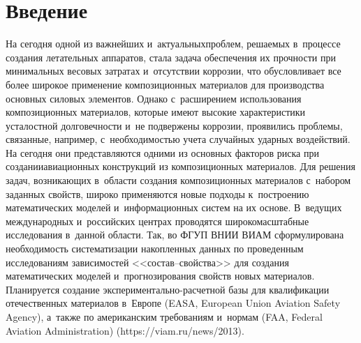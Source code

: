 
  
\vspace*{-4pt}



\thispagestyle{headings}

\begin{multicols}{2}

\label{st\stat}
      
\section{Введение}

     На сегодня одной из важнейших и~актуальных\linebreak проблем, решаемых 
в~процессе создания летательных аппаратов, стала задача обеспечения их 
прочности при минимальных весовых затратах и~отсутствии коррозии, что 
обусловливает все более \mbox{широкое} применение композиционных материалов для 
производства основных силовых элементов. Однако с~расширением 
использования композиционных материалов, которые имеют высокие 
характеристики усталостной долговечности и~не подвержены коррозии, 
проявились проб\-ле\-мы, связанные, например, с~необходимостью учета случайных 
ударных воздействий. На сегодня они пред\-став\-ля\-ют\-ся одними из основных 
факторов риска при создании\linebreak авиационных конструкций из композиционных 
материалов. Для решения задач, возникающих в~об\-ласти создания 
композиционных материалов с~набором заданных свойств, широко применяются\linebreak 
новые подходы к~построению математических моделей и~информационных 
сис\-тем на их основе. В~ведущих международных и~российских цент\-рах 
проводятся широкомасштабные исследования в~данной об\-ласти. Так, во ФГУП 
ВНИИ ВИАМ сформулирована необходимость сис\-те\-ма\-ти\-за\-ции накопленных 
данных по проведенным исследованиям зависимостей <<со\-став--свой\-ст\-ва>> 
для создания математических моделей и~прогнозирования свойств новых 
материалов. Планируется создание экс\-пе\-ри\-мен\-таль\-но-рас\-чет\-ной базы для 
квалификации отечественных материалов в~Европе (EASA, European Union Aviation Safety Agency), а~так\-же по 
американским требованиям и~нормам (FAA, Federal Aviation Administration) ({\sf https://viam.ru/news/2013}).
     

\end{multicols}

